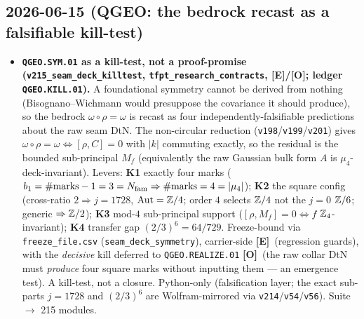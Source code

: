 \documentclass[11pt]{article}
\providecommand{\mE}{\textbf{[E]}}\providecommand{\mC}{\textbf{[C]}}
\providecommand{\mO}{\textbf{[O]}}\providecommand{\mX}{\textbf{[X]}}
\begin{document}
\subsection*{2026-06-15 (QGEO: the bedrock recast as a falsifiable kill-test)}
\begin{itemize}
\item \textbf{\texttt{QGEO.SYM.01} as a kill-test, not a proof-promise (\texttt{v215\_seam\_deck\_killtest},
  \texttt{tfpt\_research\_contracts}, \mE/\mO; ledger \texttt{QGEO.KILL.01}).} A foundational symmetry cannot
  be derived from nothing (Bisognano--Wichmann would presuppose the covariance it should produce), so the
  bedrock $\omega\circ\rho=\omega$ is recast as four independently-falsifiable predictions about the raw seam
  DtN. The non-circular reduction (\texttt{v198}/\texttt{v199}/\texttt{v201}) gives
  $\omega\circ\rho=\omega\Leftrightarrow[\rho,C]=0$ with $|k|$ commuting exactly, so the residual is the
  bounded sub-principal $M_f$ (equivalently the raw Gaussian bulk form $A$ is $\mu_4$-deck-invariant). Levers:
  \textbf{K1} exactly four marks ($b_1=\#\text{marks}-1=3=N_{\mathrm{fam}}\Rightarrow\#\text{marks}=4=|\mu_4|$);
  \textbf{K2} the square config (cross-ratio $2\Rightarrow j=1728$, $\mathrm{Aut}=\mathbb{Z}/4$; order $4$ selects
  $\mathbb{Z}/4$ not the $j=0$ $\mathbb{Z}/6$; generic $\Rightarrow\mathbb{Z}/2$); \textbf{K3} mod-$4$ sub-principal support
  ($[\rho,M_f]=0\Leftrightarrow f$ $\mathbb{Z}_4$-invariant); \textbf{K4} transfer gap $(2/3)^6=64/729$. Freeze-bound
  via \texttt{freeze\_file.csv} (\texttt{seam\_deck\_symmetry}), carrier-side \mE\ (regression guards), with
  the \emph{decisive} kill deferred to \texttt{QGEO.REALIZE.01} \mO\ (the raw collar DtN must \emph{produce}
  four square marks without inputting them --- an emergence test). A kill-test, not a closure. Python-only
  (falsification layer; the exact sub-parts $j=1728$ and $(2/3)^6$ are Wolfram-mirrored via
  \texttt{v214}/\texttt{v54}/\texttt{v56}). Suite $\to$ 215 modules.
\end{itemize}
\end{document}
